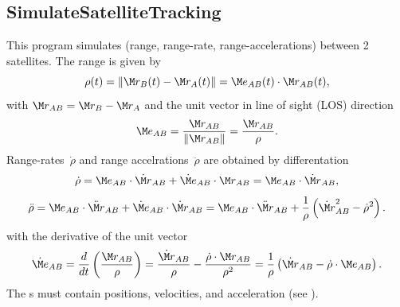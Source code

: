 \clearpage
\subsection{SimulateSatelliteTracking}\label{SimulateSatelliteTracking}
This program simulates  (range, range-rate, range-accelerations)
between 2 satellites. The range is given by
\begin{equation}
\rho(t) = \left\lVert{\M r_B(t) - \M r_A(t)}\right\rVert = \M e_{AB}(t)\cdot\M r_{AB}(t),
\end{equation}
with $\M r_{AB} = \M r_B - \M r_A$ and the unit vector in line of sight (LOS) direction
\begin{equation}\label{sst.los}
\M e_{AB} = \frac{\M r_{AB}}{\left\lVert{\M r_{AB}}\right\rVert}=\frac{\M r_{AB}}{\rho}.
\end{equation}
Range-rates~$\dot{\rho}$ and range accelrations~$\ddot{\rho}$ are obtained by differentation
\begin{equation}\label{obsRangeRate}
\dot{\rho}  = \M e_{AB}\cdot\dot{\M r}_{AB} + \dot{\M e}_{AB}\cdot\M r_{AB}
            = \M e_{AB}\cdot\dot{\M r}_{AB},
\end{equation}
\begin{equation}\label{obsRangeAccl}
\begin{split}
\ddot{\rho} &= \M e_{AB}\cdot\ddot{\M r}_{AB} +\dot{\M e}_{AB}\cdot\dot{\M r}_{AB}
            = \M e_{AB}\cdot\ddot{\M r}_{AB} +
   \frac{1}{\rho}\left(\dot{\M r}_{AB}^2-\dot{\rho}^2\right). \\
\end{split}
\end{equation}
with the derivative of the unit vector
\begin{equation}
\dot{\M e}_{AB}=\frac{d}{dt}\left(\frac{\M r_{AB}}{\rho}\right)
=\frac{\dot{\M r}_{AB}}{\rho}-\frac{\dot{\rho}\cdot\M r_{AB}}{\rho^2}
=\frac{1}{\rho}\left({\dot{\M r}_{AB}-\dot{\rho}\cdot\M e_{AB}}\right).
\end{equation}
The s must contain positions, velocities, and acceleration
(see ).


